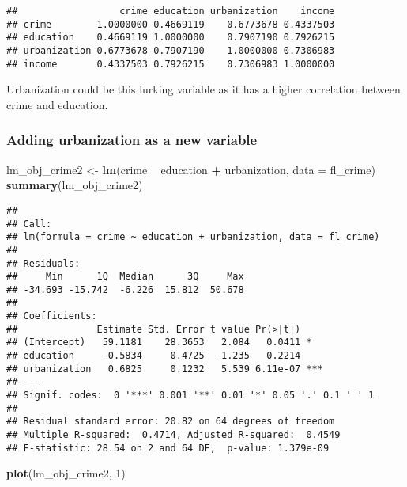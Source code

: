 \documentclass[
]{article}
\newenvironment{Shaded}{\begin{snugshade}}{\end{snugshade}}
\newcommand{\DataTypeTok}[1]{\textcolor[rgb]{0.13,0.29,0.53}{#1}}
\newcommand{\DecValTok}[1]{\textcolor[rgb]{0.00,0.00,0.81}{#1}}
\newcommand{\KeywordTok}[1]{\textcolor[rgb]{0.13,0.29,0.53}{\textbf{#1}}}
\newcommand{\NormalTok}[1]{#1}
\newcommand{\OperatorTok}[1]{\textcolor[rgb]{0.81,0.36,0.00}{\textbf{#1}}}
\newcommand{\StringTok}[1]{\textcolor[rgb]{0.31,0.60,0.02}{#1}}
\begin{document}
\begin{verbatim}
##                  crime education urbanization    income
## crime        1.0000000 0.4669119    0.6773678 0.4337503
## education    0.4669119 1.0000000    0.7907190 0.7926215
## urbanization 0.6773678 0.7907190    1.0000000 0.7306983
## income       0.4337503 0.7926215    0.7306983 1.0000000
\end{verbatim}

Urbanization could be this lurking variable as it has a higher
correlation between crime and education.

\hypertarget{adding-urbanization-as-a-new-variable}{%
\subsubsection{Adding urbanization as a new
variable}\label{adding-urbanization-as-a-new-variable}}

\begin{Shaded}
\begin{Highlighting}[]
\NormalTok{lm_obj_crime2 <-}\StringTok{ }\KeywordTok{lm}\NormalTok{(crime }\OperatorTok{~}\StringTok{ }\NormalTok{education }\OperatorTok{+}\StringTok{ }\NormalTok{urbanization, }\DataTypeTok{data =}\NormalTok{ fl_crime)}
\KeywordTok{summary}\NormalTok{(lm_obj_crime2)}
\end{Highlighting}
\end{Shaded}

\begin{verbatim}
## 
## Call:
## lm(formula = crime ~ education + urbanization, data = fl_crime)
## 
## Residuals:
##     Min      1Q  Median      3Q     Max 
## -34.693 -15.742  -6.226  15.812  50.678 
## 
## Coefficients:
##              Estimate Std. Error t value Pr(>|t|)    
## (Intercept)   59.1181    28.3653   2.084   0.0411 *  
## education     -0.5834     0.4725  -1.235   0.2214    
## urbanization   0.6825     0.1232   5.539 6.11e-07 ***
## ---
## Signif. codes:  0 '***' 0.001 '**' 0.01 '*' 0.05 '.' 0.1 ' ' 1
## 
## Residual standard error: 20.82 on 64 degrees of freedom
## Multiple R-squared:  0.4714, Adjusted R-squared:  0.4549 
## F-statistic: 28.54 on 2 and 64 DF,  p-value: 1.379e-09
\end{verbatim}

\begin{Shaded}
\begin{Highlighting}[]
\KeywordTok{plot}\NormalTok{(lm_obj_crime2, }\DecValTok{1}\NormalTok{)}
\end{Highlighting}
\end{Shaded}
\end{document}
